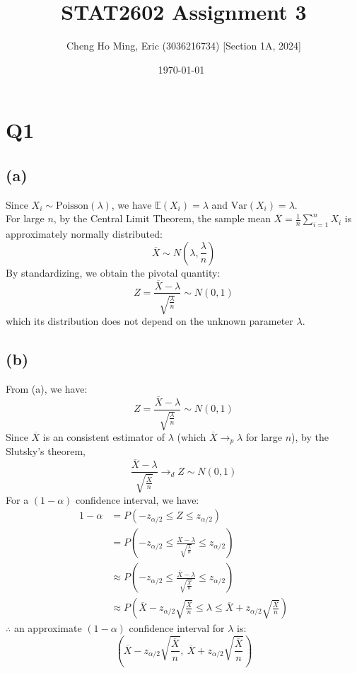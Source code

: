 \documentclass{article}
\title{STAT2602 Assignment 3}
\author{Cheng Ho Ming, Eric (3036216734) [Section 1A, 2024]}
\date{\today \ \currenttime}
\begin{document}
\maketitle

\section*{Q1}

\subsection*{(a)}

Since \( X_i \sim \text{Poisson}(\lambda) \), we have \( \mathbb{E}(X_i) = \lambda \) and \( \text{Var}(X_i) = \lambda \). \\
For large \( n \), by the Central Limit Theorem, the sample mean \( \overline{X} = \frac{1}{n}\sum_{i=1}^n X_i \) is approximately normally distributed:
\[
\overline{X} \sim N\left(\lambda, \frac{\lambda}{n}\right)
\]
By standardizing, we obtain the pivotal quantity:
\[
Z = \frac{\overline{X} - \lambda}{\sqrt{\frac{\lambda}{n}}} \sim N(0,1)
\]
which its distribution does not depend on the unknown parameter \( \lambda \).

\subsection*{(b)}

From (a), we have:
\[
Z = \frac{\overline{X} - \lambda}{\sqrt{\frac{\lambda}{n}}} \sim N(0,1)
\]
Since $\overline{X}$ is an consistent estimator of $\lambda$ (which $\overline{X} \rightarrow_p \lambda$ for large $n$), by the Slutsky's theorem,
\[
\frac{\overline{X} - \lambda}{\sqrt{\frac{\bar{X}}{n}}} \rightarrow_d Z \sim N(0,1)
\]
For a \( (1 - \alpha) \) confidence interval, we have:
\begin{align*}
1 - \alpha &= P\left(-z_{\alpha/2} \leq Z \leq z_{\alpha/2}\right) \\
&= P\left(-z_{\alpha/2} \leq \frac{\overline{X} - \lambda}{\sqrt{\frac{\lambda}{n}}} \leq z_{\alpha/2}\right) \\
&\approx P\left(-z_{\alpha/2} \leq \frac{\overline{X} - \lambda}{\sqrt{\frac{\bar{X}}{n}}} \leq z_{\alpha/2}\right) \\
&\approx P\left(\overline{X} - z_{\alpha/2}\sqrt{\frac{\bar{X}}{n}} \leq \lambda \leq \overline{X} + z_{\alpha/2}\sqrt{\frac{\bar{X}}{n}}\right)
\end{align*}
$\therefore$ an approximate \( (1 - \alpha) \) confidence interval for \( \lambda \) is:
\[
\left(\overline{X} - z_{\alpha/2}\sqrt{\frac{\overline{X}}{n}}, \ \overline{X} + z_{\alpha/2}\sqrt{\frac{\overline{X}}{n}}\right)
\]
\end{document}
